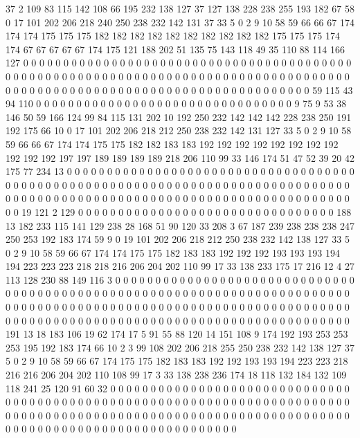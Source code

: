 37 2 109 83 115 142 108 66 195 232 138 127 37 127 138 228 238 255 193 182
67 58 0 17 101 202 206 218 240 250 238 232 142 131 37 33 5 0 2 9
10 58 59 66 66 67 174 174 174 175 175 175 182 182 182 182 182 182 182 182
182 182 175 175 175 174 174 67 67 67 67 67 174 175 121 188 202 51 135 75
143 118 49 35 110 88 114 166 127 0 0 0 0 0 0 0 0 0 0 0
0 0 0 0 0 0 0 0 0 0 0 0 0 0 0 0 0 0 0 0
0 0 0 0 0 0 0 0 0 0 0 0 0 0 0 0 0 0 0 0
0 0 0 0 0 0 0 0 0 0 0 0 0 0 0 0 0 0 0 0
0 0 0 0 0 0 0 0 0 0 0 0 0 0 0 0 0 0 0 0
0 0 0 0 0 0 0 0 0 0 0 0 0 0 0 0 0 0 0 0
0 0 0 0 0 0 0 0 0 0 0 59 115 43 94 110 0 0 0 0
0 0 0 0 0 0 0 0 0 0 0 0 0 0 0 0 0 0 0 0
0 0 0 0 0 0 0 0 9 75 9 53 38 146 50 59 166 124 99 84
115 131 202 10 192 250 232 142 142 142 228 238 250 191 192 175 66 10 0 17
101 202 206 218 212 250 238 232 142 131 127 33 5 0 2 9 10 58 59 66
66 67 174 174 175 175 182 182 183 183 192 192 192 192 192 192 192 192 192 192
192 197 197 189 189 189 189 218 206 110 99 33 146 174 51 47 52 39 20 42
175 77 234 13 0 0 0 0 0 0 0 0 0 0 0 0 0 0 0 0
0 0 0 0 0 0 0 0 0 0 0 0 0 0 0 0 0 0 0 0
0 0 0 0 0 0 0 0 0 0 0 0 0 0 0 0 0 0 0 0
0 0 0 0 0 0 0 0 0 0 0 0 0 0 0 0 0 0 0 0
0 0 0 0 0 0 0 0 0 0 0 0 0 0 0 0 0 0 0 0
0 0 0 0 0 0 0 0 0 0 0 0 0 0 0 0 0 0 0 0
0 0 0 0 0 0 0 0 19 121 2 129 0 0 0 0 0 0 0 0
0 0 0 0 0 0 0 0 0 0 0 0 0 0 0 0 0 0 0 0
0 0 0 0 188 13 182 233 115 141 129 238 28 168 51 90 120 33 208 3
67 187 239 238 238 238 247 250 253 192 183 174 59 9 0 19 101 202 206 218
212 250 238 232 142 138 127 33 5 0 2 9 10 58 59 66 67 174 174 175
175 182 183 183 192 192 192 193 193 193 194 194 223 223 223 218 218 216 206 204
202 110 99 17 33 138 233 175 17 216 12 4 27 113 128 230 88 149 116 3
0 0 0 0 0 0 0 0 0 0 0 0 0 0 0 0 0 0 0 0
0 0 0 0 0 0 0 0 0 0 0 0 0 0 0 0 0 0 0 0
0 0 0 0 0 0 0 0 0 0 0 0 0 0 0 0 0 0 0 0
0 0 0 0 0 0 0 0 0 0 0 0 0 0 0 0 0 0 0 0
0 0 0 0 0 0 0 0 0 0 0 0 0 0 0 0 0 0 0 0
0 0 0 0 0 0 0 0 0 0 0 0 0 0 0 0 0 0 0 0
0 0 0 0 0 0 0 0 0 0 0 0 0 0 0 0 0 0 0 0
0 0 0 0 0 0 0 0 0 0 0 0 0 0 0 0 0 0 0 191
13 18 183 106 19 62 174 17 5 91 55 88 120 14 151 108 9 174 192 193
253 253 253 195 192 183 174 66 10 2 3 99 108 202 206 218 255 250 238 232
142 138 127 37 5 0 2 9 10 58 59 66 67 174 175 175 182 183 183 192
192 193 193 194 223 223 218 216 216 206 204 202 110 108 99 17 3 33 138 238
236 174 18 118 132 184 132 109 118 241 25 120 91 60 32 0 0 0 0 0
0 0 0 0 0 0 0 0 0 0 0 0 0 0 0 0 0 0 0 0
0 0 0 0 0 0 0 0 0 0 0 0 0 0 0 0 0 0 0 0
0 0 0 0 0 0 0 0 0 0 0 0 0 0 0 0 0 0 0 0
0 0 0 0 0 0 0 0 0 0 0 0 0 0 0 0 0 0 0 0
0 0 0 0 0 0 0 0 0 0 0 0 0 0 0 0 0 0 0 0
0 0 0 0 0 0 0 0 0 0 0 0 0 0 0 0 0 0 0 0
0 0 0 0 0 0 0 0 0 0 0 0 0 0 0 0 0 0 0 0
